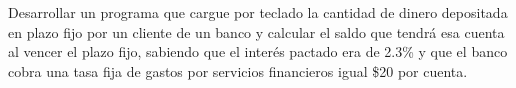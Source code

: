 Desarrollar un programa que cargue por teclado la cantidad de dinero depositada en plazo fijo por un cliente de un banco y calcular el saldo que tendrá esa cuenta al vencer el plazo fijo, sabiendo que el interés pactado era de 2.3\% y que el banco cobra una tasa fija de gastos por servicios financieros igual \$20 por cuenta.

